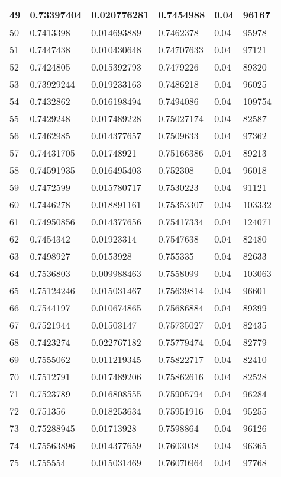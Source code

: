 \begin{longtable}{|l|l|l|l|l|l|}
49 & 0.73397404 & 0.020776281 & 0.7454988 & 0.04 & 96167 \\ \hline 
50 & 0.7413398 & 0.014693889 & 0.7462378 & 0.04 & 95978 \\ \hline 
51 & 0.7447438 & 0.010430648 & 0.74707633 & 0.04 & 97121 \\ \hline 
52 & 0.7424805 & 0.015392793 & 0.7479226 & 0.04 & 89320 \\ \hline 
53 & 0.73929244 & 0.019233163 & 0.7486218 & 0.04 & 96025 \\ \hline 
54 & 0.7432862 & 0.016198494 & 0.7494086 & 0.04 & 109754 \\ \hline 
55 & 0.7429248 & 0.017489228 & 0.75027174 & 0.04 & 82587 \\ \hline 
56 & 0.7462985 & 0.014377657 & 0.7509633 & 0.04 & 97362 \\ \hline 
57 & 0.74431705 & 0.01748921 & 0.75166386 & 0.04 & 89213 \\ \hline 
58 & 0.74591935 & 0.016495403 & 0.752308 & 0.04 & 96018 \\ \hline 
59 & 0.7472599 & 0.015780717 & 0.7530223 & 0.04 & 91121 \\ \hline 
60 & 0.7446278 & 0.018891161 & 0.75353307 & 0.04 & 103332 \\ \hline 
61 & 0.74950856 & 0.014377656 & 0.75417334 & 0.04 & 124071 \\ \hline 
62 & 0.7454342 & 0.01923314 & 0.7547638 & 0.04 & 82480 \\ \hline 
63 & 0.7498927 & 0.0153928 & 0.755335 & 0.04 & 82633 \\ \hline 
64 & 0.7536803 & 0.009988463 & 0.7558099 & 0.04 & 103063 \\ \hline 
65 & 0.75124246 & 0.015031467 & 0.75639814 & 0.04 & 96601 \\ \hline 
66 & 0.7544197 & 0.010674865 & 0.75686884 & 0.04 & 89399 \\ \hline 
67 & 0.7521944 & 0.01503147 & 0.75735027 & 0.04 & 82435 \\ \hline 
68 & 0.7423274 & 0.022767182 & 0.75779474 & 0.04 & 82779 \\ \hline 
69 & 0.7555062 & 0.011219345 & 0.75822717 & 0.04 & 82410 \\ \hline 
70 & 0.7512791 & 0.017489206 & 0.75862616 & 0.04 & 82528 \\ \hline 
71 & 0.7523789 & 0.016808555 & 0.75905794 & 0.04 & 96284 \\ \hline 
72 & 0.751356 & 0.018253634 & 0.75951916 & 0.04 & 95255 \\ \hline 
73 & 0.75288945 & 0.01713928 & 0.7598864 & 0.04 & 96126 \\ \hline 
74 & 0.75563896 & 0.014377659 & 0.7603038 & 0.04 & 96365 \\ \hline 
75 & 0.755554 & 0.015031469 & 0.76070964 & 0.04 & 97768 \\ \hline 
\end{longtable}